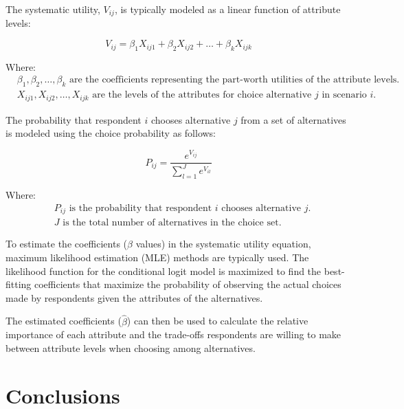 \documentclass[3p,12pt ]{elsarticle}
\begin{document}
The systematic utility, \( V_{ij} \), is typically modeled as a linear function of attribute levels:

\begin{equation}
V_{ij} = \beta_1 X_{ij1} + \beta_2 X_{ij2} + \ldots + \beta_k X_{ijk}
\end{equation}

Where:
\begin{align*}
&\beta_1, \beta_2, \ldots, \beta_k \text{ are the coefficients representing the part-worth utilities of the attribute levels.} \\
&X_{ij1}, X_{ij2}, \ldots, X_{ijk} \text{ are the levels of the attributes for choice alternative } j \text{ in scenario } i.
\end{align*}

The probability that respondent \( i \) chooses alternative \( j \) from a set of alternatives is modeled using the choice probability as follows:

\begin{equation}
P_{ij} = \frac{e^{V_{ij}}}{\sum_{l=1}^{J} e^{V_{il}}}
\end{equation}

Where:
\begin{align*}
&P_{ij} \text{ is the probability that respondent } i \text{ chooses alternative } j. \\
&J \text{ is the total number of alternatives in the choice set.}
\end{align*}

To estimate the coefficients (\( \beta \) values) in the systematic utility equation, maximum likelihood estimation (MLE) methods are typically used. The likelihood function for the conditional logit model is maximized to find the best-fitting coefficients that maximize the probability of observing the actual choices made by respondents given the attributes of the alternatives.

The estimated coefficients (\( \hat{\beta} \)) can then be used to calculate the relative importance of each attribute and the trade-offs respondents are willing to make between attribute levels when choosing among alternatives.



\section{Conclusions}



\newpage


\pagebreak




\end{document}
